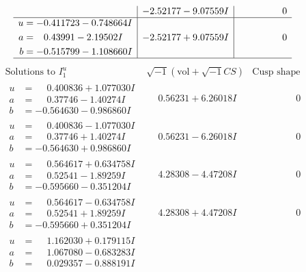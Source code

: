 \documentclass[1p]{elsarticle_modified}
\theoremstyle{definition}
\newcommand{\I}{\sqrt{-1}}
\begin{document}
$$\begin{array}{c|c|c}
 & -2.52177 - 9.07559 I & \phantom{-0.000000 } 0 \\ \hline\begin{aligned}
u &= -0.411723 - 0.748664 I \\
a &= \phantom{-}0.43991 - 2.19502 I \\
b &= -0.515799 - 1.108660 I\end{aligned}
 & -2.52177 + 9.07559 I & \phantom{-0.000000 } 0\\
 \hline 
 \end{array}$$\newpage$$\begin{array}{c|c|c}  
\text{Solutions to }I^u_{1}& \I (\text{vol} + \sqrt{-1}CS) & \text{Cusp shape}\\
 \hline 
\begin{aligned}
u &= \phantom{-}0.400836 + 1.077030 I \\
a &= \phantom{-}0.37746 - 1.40274 I \\
b &= -0.564630 - 0.986860 I\end{aligned}
 & \phantom{-}0.56231 + 6.26018 I & \phantom{-0.000000 } 0 \\ \hline\begin{aligned}
u &= \phantom{-}0.400836 - 1.077030 I \\
a &= \phantom{-}0.37746 + 1.40274 I \\
b &= -0.564630 + 0.986860 I\end{aligned}
 & \phantom{-}0.56231 - 6.26018 I & \phantom{-0.000000 } 0 \\ \hline\begin{aligned}
u &= \phantom{-}0.564617 + 0.634758 I \\
a &= \phantom{-}0.52541 - 1.89259 I \\
b &= -0.595660 - 0.351204 I\end{aligned}
 & \phantom{-}4.28308 - 4.47208 I & \phantom{-0.000000 } 0 \\ \hline\begin{aligned}
u &= \phantom{-}0.564617 - 0.634758 I \\
a &= \phantom{-}0.52541 + 1.89259 I \\
b &= -0.595660 + 0.351204 I\end{aligned}
 & \phantom{-}4.28308 + 4.47208 I & \phantom{-0.000000 } 0 \\ \hline\begin{aligned}
u &= \phantom{-}1.162030 + 0.179115 I \\
a &= \phantom{-}1.067080 - 0.683283 I \\
b &= \phantom{-}0.029357 - 0.888191 I\end{aligned}

\end{array}$$
\end{document}
